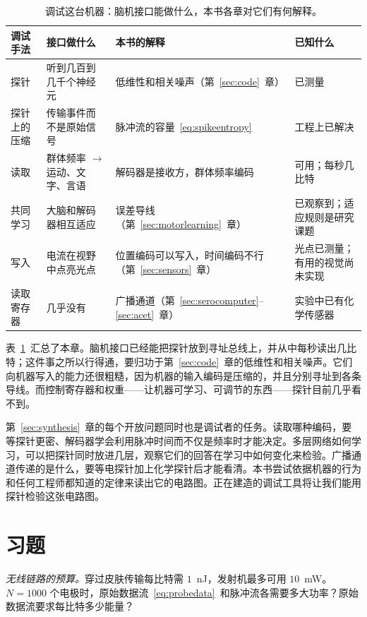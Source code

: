 \begin{table}[t]
\centering
\footnotesize
\setlength{\tabcolsep}{4pt}
\renewcommand{\arraystretch}{1.15}
\begin{tabular}{>{\raggedright}p{2.2cm}>{\raggedright}p{3.6cm}>{\raggedright}p{3.4cm}>{\raggedright\arraybackslash}p{4.0cm}}
\toprule
调试手法 & 接口做什么 & 本书的解释 & 已知什么 \\
\midrule
探针 & 听到几百到几千个神经元 & 低维性和相关噪声（第~\ref{sec:code}~章） & 已测量 \\
探针上的压缩 & 传输事件而不是原始信号 & 脉冲流的容量~\eqref{eq:spikeentropy} & 工程上已解决 \\
读取 & 群体频率 $\to$ 运动、文字、言语 & 解码器是接收方，群体频率编码 & 可用；每秒几比特 \\
共同学习 & 大脑和解码器相互适应 & 误差导线（第~\ref{sec:motorlearning}~章） & 已观察到；适应规则是研究课题 \\
写入 & 电流在视野中点亮光点 & 位置编码可以写入，时间编码不行（第~\ref{sec:sensors}~章） & 光点已测量；有用的视觉尚未实现 \\
读取寄存器 & 几乎没有 & 广播通道（第~\ref{sec:serocomputer}--\ref{sec:acet}~章） & 实验中已有化学传感器 \\
\bottomrule
\end{tabular}
\caption{调试这台机器：脑机接口能做什么，本书各章对它们有何解释。}
\label{tab:debugging}
\end{table}

表~\ref{tab:debugging}~汇总了本章。脑机接口已经能把探针放到寻址总线上，并从中每秒读出几比特；这件事之所以行得通，要归功于第~\ref{sec:code}~章的低维性和相关噪声。它们向机器写入的能力还很粗糙，因为机器的输入编码是压缩的，并且分别寻址到各条导线。而控制寄存器和权重——让机器可学习、可调节的东西——探针目前几乎看不到。

第~\ref{sec:synthesis}~章的每个开放问题同时也是调试者的任务。读取哪种编码，要等探针更密、解码器学会利用脉冲时间而不仅是频率时才能决定。多层网络如何学习，可以把探针同时放进几层，观察它们的回答在学习中如何变化来检验。广播通道传递的是什么，要等电探针加上化学探针后才能看清。本书尝试依据机器的行为和任何工程师都知道的定律来读出它的电路图。正在建造的调试工具将让我们能用探针检验这张电路图。

\section{习题}

\begin{exercise}[\lvlA]
\label{ex:17:1}
\emph{无线链路的预算。}穿过皮肤传输每比特需 $1$~nJ，发射机最多可用 $10$~mW。$N=1000$ 个电极时，原始数据流~\eqref{eq:probedata}~和脉冲流各需要多大功率？原始数据流要求每比特多少能量？
\end{exercise}

